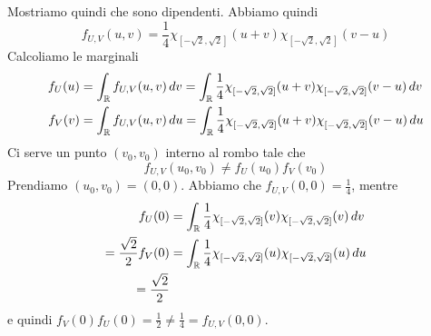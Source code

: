 \documentclass[a4paper]{article}
\begin{document}
\begin{snippetsolution}{}
\begin{center}
    \end{center}
    Mostriamo quindi che sono dipendenti.
    Abbiamo quindi \[
        f_{U,V}(u,v) = \frac14 \chi_{[-\sqrt 2, \sqrt 2]}(u+v) \chi_{[-\sqrt 2, \sqrt 2]}(v-u)
    \]
    Calcoliamo le marginali
    \begin{align*}
        f_U(u) &= \int_{\mathbb{R}} f_{U,V}(u,v)\,dv = \int_{\mathbb{R}} \frac14\chi_{[-\sqrt 2, \sqrt 2]}(u+v) \chi_{[-\sqrt 2, \sqrt 2]}(v-u)\,dv \\
        f_V(v) &= \int_{\mathbb{R}} f_{U,V}(u,v)\,du = \int_{\mathbb{R}} \frac14\chi_{[-\sqrt 2, \sqrt 2]}(u+v) \chi_{[-\sqrt 2, \sqrt 2]}(v-u)\,du
    \end{align*}
    Ci serve un punto \((v_0, v_0)\) interno al rombo tale che \[
        f_{U,V}(u_0, v_0) \neq f_U(u_0)f_V(v_0)
    \]
    Prendiamo \((u_0, v_0) = (0,0)\). Abbiamo che \(f_{U,V} (0,0) = \frac14\), mentre
    \begin{align*}
        f_U(0) &= \int_{\mathbb{R}} \frac14 \chi_{[-\sqrt 2, \sqrt 2]}(v) \chi_{[-\sqrt 2, \sqrt 2]}(v)\,dv \\
        = \frac{\sqrt 2}{2}
        f_V(0) &= \int_{\mathbb{R}} \frac14 \chi_{[-\sqrt 2, \sqrt 2]}(u) \chi_{[-\sqrt 2, \sqrt 2]}(u)\,du \\
        = \frac{\sqrt 2}{2}
    \end{align*}
    e quindi \(f_V(0)f_U(0) = \frac12 \neq \frac14 = f_{U,V}(0,0)\).
\end{snippetsolution}
\end{document}
